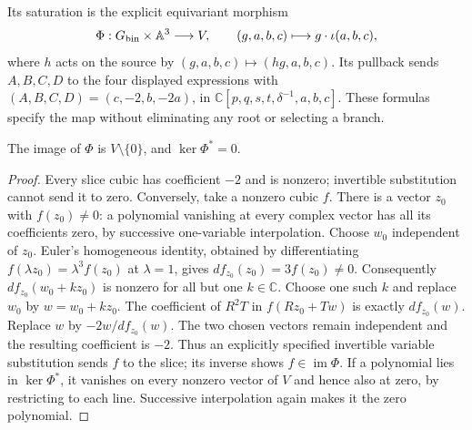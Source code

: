 Its saturation is the explicit equivariant morphism
\[
 \Phi:G_{\rm bin}\times\mathbb A^3\longrightarrow V,
 \qquad(g,a,b,c)\longmapsto g\cdot\iota(a,b,c),
\]
where $h$ acts on the source by $(g,a,b,c)\mapsto(hg,a,b,c)$.
Its pullback sends $A,B,C,D$ to the four displayed expressions with
$(A,B,C,D)=(c,-2,b,-2a)$, in
$\mathbb C[p,q,s,t,\delta^{-1},a,b,c]$. These formulas specify the
map without eliminating any root or selecting a branch.

\begin{proposition}\label{prop:invariant-saturation}
The image of $\Phi$ is $V\setminus\{0\}$, and $\ker\Phi^*=0$.
\end{proposition}
\begin{proof}
Every slice cubic has coefficient $-2$ and is nonzero; invertible
substitution cannot send it to zero. Conversely, take a nonzero cubic
$f$. There is a vector $z_0$ with $f(z_0)\ne0$: a polynomial vanishing
at every complex vector has all its coefficients zero, by successive
one-variable interpolation. Choose $w_0$ independent of $z_0$.
Euler's homogeneous identity, obtained by differentiating
$f(\lambda z_0)=\lambda^3f(z_0)$ at $\lambda=1$, gives
$df_{z_0}(z_0)=3f(z_0)\ne0$. Consequently
$df_{z_0}(w_0+kz_0)$ is nonzero for all but one $k\in\mathbb C$.
Choose one such $k$ and replace $w_0$ by $w=w_0+kz_0$.
The coefficient of $R^2T$ in $f(Rz_0+Tw)$ is exactly $df_{z_0}(w)$.
Replace $w$ by $-2w/df_{z_0}(w)$. The two chosen vectors remain
independent and the resulting coefficient is $-2$. Thus an explicitly
specified invertible variable substitution sends $f$ to the slice;
its inverse shows $f\in\operatorname{im}\Phi$. If a polynomial lies
in $\ker\Phi^*$, it vanishes on every nonzero vector of $V$ and hence
also at zero, by restricting to each line. Successive interpolation
again makes it the zero polynomial.
\end{proof}

